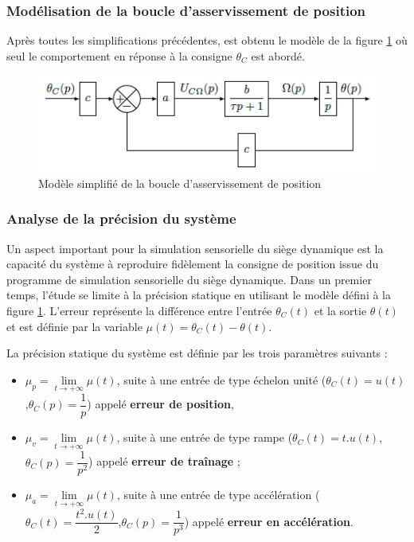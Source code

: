 \subsubsection{Modélisation de la boucle d'asservissement de position}

Après toutes les simplifications précédentes, est obtenu le modèle de la figure \ref{fig14} où seul le comportement en réponse à la consigne $\theta_C$ est abordé.

\begin{figure}[!ht]
\begin{center}
 \includegraphics[width=0.7\linewidth]{img/img14}
\end{center}
\caption{Modèle simplifié de la boucle d'asservissement de position}
\label{fig14}
\end{figure}

\newpage


\subsubsection{Analyse de la précision du système}

Un aspect important pour la simulation sensorielle du siège dynamique est la capacité du système à reproduire fidèlement la consigne de position issue du programme de simulation sensorielle du siège dynamique. Dans un premier temps, l'étude se limite à la précision statique en utilisant le modèle défini à la figure \ref{fig14}. L'erreur représente la différence entre l'entrée $\theta_C(t)$ et la sortie $\theta(t)$ et est définie par la variable $\mu(t)=\theta_C(t)-\theta(t)$.

La précision statique du système est définie par les trois paramètres suivants :
\begin{itemize}
 \item $\mu_p=\lim\limits_{t \rightarrow +\infty} \mu(t)$, suite à une entrée de type échelon unité ($\theta_C(t)=u(t)$,$\theta_C(p)=\dfrac{1}{p}$) appelé \textbf{erreur de position},
 \item $\mu_v=\lim\limits_{t \rightarrow +\infty} \mu(t)$, suite à une entrée de type rampe ($\theta_C(t)=t.u(t)$,$\theta_C(p)=\dfrac{1}{p^2}$) appelé \textbf{erreur de traînage} ;
 \item $\mu_a=\lim\limits_{t \rightarrow +\infty} \mu(t)$, suite à une entrée de type accélération ($\theta_C(t)=\dfrac{t^2.u(t)}{2}$,$\theta_C(p)=\dfrac{1}{p^3}$) appelé \textbf{erreur en accélération}.
\end{itemize}

